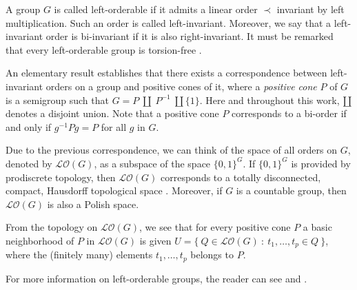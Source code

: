 \documentclass[12pt]{article}
\theoremstyle{definition}
\begin{document}
A group $G$ is called left-orderable if it admits a linear order $\prec$ invariant by left multiplication. Such an order is called left-invariant. Moreover, we say that a left-invariant order is bi-invariant if it is also right-invariant. It must be remarked that every left-orderable group is torsion-free \cite[Proposition 1.3]{ClayRolfsen}.

An elementary result establishes that there exists a correspondence between left-invariant orders on a group and positive cones of it, where a {\it positive cone} $P$ of $G$ is a semigroup such that $G=P\ \amalg\ P^{-1}\ \amalg \{1\}.$ Here and throughout this work, $\amalg$ denotes a disjoint union. Note that a positive cone $P$ corresponds to a bi-order if and only if $g^{-1}Pg=P$ for all $g$ in $G$. 

Due to the previous correspondence, we can think of the space of all orders on $G$, denoted by $\mathcal{LO}(G)$, as a subspace of the space $\{0,1\}^{G}$. 
If $\{0,1\}^{G}$ is provided by prodiscrete topology, %
then $\mathcal{LO}(G)$ corresponds to a totally disconnected, compact, Hausdorff topological space \cite[Section 1.5]{ClayRolfsen}. 
Moreover, if $G$ is a countable group, then $\mathcal{LO}(G)$ is also a Polish space. %

From the topology on $\mathcal{LO}(G)$, we see that for every positive cone $P$ 
a basic neighborhood of $P$ in $\mathcal{LO}(G)$ is given $U=\{\ Q\in \mathcal{LO}(G)\ : \ t_1,\dots,t_p\in Q\ \}$, where the (finitely many) elements $t_1,\dots, t_p$ belongs to $P$.

For more information on left-orderable groups, the reader can see \cite{ClayRolfsen} and \cite{GOD}.
\end{document}
